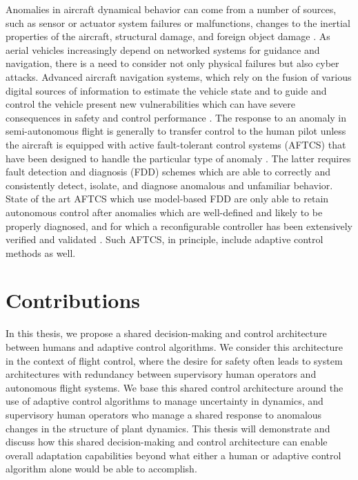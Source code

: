 
Anomalies in aircraft dynamical behavior can come from a number of sources, such as sensor or actuator system failures or malfunctions, changes to the inertial properties of the aircraft, structural damage, and foreign object damage \cite{belcastro2016aircraft}. As aerial vehicles increasingly depend on networked systems for guidance and navigation, there is a need to consider not only physical failures but also cyber attacks. Advanced aircraft navigation systems, which rely on the fusion of various digital sources of information to estimate the vehicle state and to guide and control the vehicle present new vulnerabilities which can have severe consequences in safety and control performance \cite{kim2012cyber, kerns2014unmanned, kwon2014analysis, amin2009safe}. The response to an anomaly in semi-autonomous flight is generally to transfer control to the human pilot unless the aircraft is equipped with active fault-tolerant control systems (AFTCS) that have been designed to handle the particular type of anomaly \cite{zhang2008bibliographical}. The latter requires fault detection and diagnosis (FDD) schemes which are able to correctly and consistently detect, isolate, and diagnose anomalous and unfamiliar behavior. State of the art AFTCS which use model-based FDD are only able to retain autonomous control after anomalies which are well-defined and likely to be properly diagnosed, and for which a reconfigurable controller has been extensively verified and validated \cite{zhang2008bibliographical}. Such AFTCS, in principle, include adaptive control methods as well.

\section{Contributions}

In this thesis, we propose a shared decision-making and control architecture between humans and adaptive control algorithms. We consider this architecture in the context of flight control, where the desire for safety often leads to system architectures with redundancy between supervisory human operators and autonomous flight systems. We base this shared control architecture around the use of adaptive control algorithms to manage uncertainty in dynamics, and supervisory human operators who manage a shared response to anomalous changes in the structure of plant dynamics. This thesis will demonstrate and discuss how this shared decision-making and control architecture can enable overall adaptation capabilities beyond what either a human or adaptive control algorithm alone would be able to accomplish.

